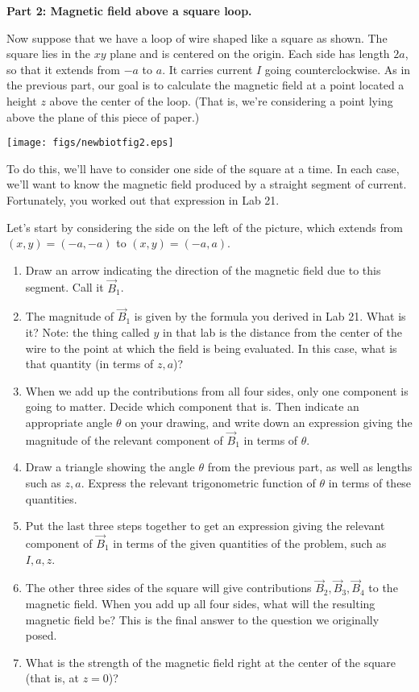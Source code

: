 \documentclass{article}
\begin{document}
\bigskip

{\bf Part 2: Magnetic field above a square loop.}

Now suppose that we have a loop of wire shaped like a square as shown.
The square lies in the $xy$ plane and is centered on the origin.
Each side has length $2a$, so that it extends from $-a$ to $a$.
It carries current $I$ going counterclockwise.  As in the previous
part, our goal is to calculate the magnetic field at a point 
located a height $z$ above the center of the loop.  (That is, we're
considering a point lying above the plane of this piece of paper.)

\medskip
\centerline{\texttt{[image: figs/newbiotfig2.eps]}}
\medskip


To do this, we'll have to consider one side of the square at a time.  In
each case, we'll want to know the magnetic field produced by 
a straight segment of current.  Fortunately, you worked out
that expression in Lab 21. 


Let's start by considering 
the side on the left of the picture, which extends from
$(x,y)=(-a,-a)$ to $(x,y)=(-a,a)$.

\begin{enumerate}

\item Draw an arrow indicating the 
direction of the magnetic field due to this segment.
Call it $\vec{B}_1$.

\item The magnitude of $\vec{B}_1$ is given by the formula
you derived in Lab 21. What is it? Note: the thing
called $y$ in that lab is the distance from the center of
the wire to the point at which the field is being evaluated. 
In this case, what is that quantity (in terms of $z,a$)?

\item When we add up the contributions from all four sides, only
one component is going to matter.  Decide which
component that is. Then indicate an
appropriate angle $\theta$ on your drawing, and 
write down an expression giving
the magnitude of the relevant component of $\vec{B}_1$ in terms of $\theta$.  

\item Draw a triangle showing the angle $\theta$ from the previous part,
as well as lengths such as $z,a$.  Express the relevant trigonometric
function of $\theta$ in terms of these quantities.

\item Put the last three steps together to get an expression giving the
relevant component of $\vec{B}_1$ in terms of the given quantities of the
problem, such as $I,a,z$.  

\item \label{answer2}
The other three sides of the square will give contributions
$\vec{B}_2,\vec{B}_3,\vec{B}_4$ to the magnetic field.  When you add
up all four sides, what will the resulting magnetic field be?
This is the final answer to the question we originally posed.

\item What is the strength of the magnetic field right at the
center of the square (that is, at $z=0$)?

\end{enumerate}
\end{document}
